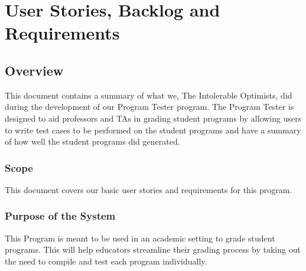 \chapter{User Stories, Backlog and Requirements}
\section{Overview}

This document contains a summary of what we, The Intolerable Optimists, did during the development of our Program Tester program. The Program Tester is designed to aid professors and TAs in grading student programs by allowing users to write test cases to be performed on the student programs and have a summary of how well the student programs did generated.









\subsection{Scope}
This document covers our basic user stories and requirements for this program.




\subsection{Purpose of the System}
This Program is meant to be used in an academic setting to grade student programs. 
This will help educators streamline their grading process by taking out the need to 
compile and test each program individually.


